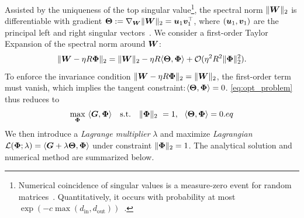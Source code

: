 Assisted by the uniqueness of the top singular value\footnote{Numerical coincidence of singular values is a measure-zero event for random matrices~\citep{tao2014randommatricessimplespectrum}. Quantitatively, it occurs with probability at most $\exp(-c\max(d_{\mathrm{in}},d_{\mathrm{out}}))$~\citep{han2025repeatedsingularvaluesrandom}.}, the spectral norm $\|{\bm{W}}\|_2$ is differentiable with gradient ${\bm{\Theta}} := \nabla_{{\bm{W}}}\|{\bm{W}}\|_2 = {\bm{u}}_1 {\bm{v}}_1^\top$, where $({\bm{u}}_1, {\bm{v}}_1)$ are the principal left and right singular vectors~\citep{watson1992characterization}.
We consider a first-order Taylor Expansion of the spectral norm around ${\bm{W}}$:
\begin{equation}
\label{eq:taylor_spectral}
\|{\bm{W}} - \eta R {\bm{\Phi}}\|_2 = \|{\bm{W}}\|_2 - \eta R \langle {\bm{\Theta}}, {\bm{\Phi}} \rangle + \mathcal{O}(\eta^2 R^2 \|{\bm{\Phi}}\|_2^2).
\end{equation}
To enforce the invariance condition $\|{\bm{W}} - \eta R {\bm{\Phi}}\|_2 = \|{\bm{W}}\|_2$, the first-order term must vanish, which implies the tangent constraint:$\langle {\bm{\Theta}}, {\bm{\Phi}} \rangle = 0$.
\cref{eq:opt_problem} thus reduces to
\begin{equation}
\label{eq:linearized_opt}
\max_{{\bm{\Phi}}}\ \langle {\bm{G}},{\bm{\Phi}}\rangle
\quad \text{s.t.}\quad
\|{\bm{\Phi}}\|_2\ = 1,\ \ \langle {\bm{\Theta}},{\bm{\Phi}}\rangle = 0.
eq\end{equation}
We then introduce a \emph{Lagrange multiplier} \(\lambda\) and maximize \emph{Lagrangian}  \( \mathcal{L}({\bm{\Phi}}; \lambda) =  \langle {\bm{G}}+\lambda{\bm{\Theta}},{\bm{\Phi}}\rangle\) under constraint \(\|{\bm{\Phi}}\|_2=1\). The analytical solution and numerical method are summarized below.


